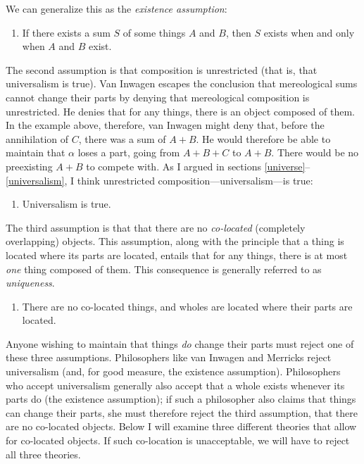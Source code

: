 \documentclass[11pt]{article}
\begin{document}
\begin{spacing}{1.5}
We can generalize this as the {\em existence assumption}:

\begin{enumerate}[ref=(\arabic*)]
  \item If there exists a sum $S$ of some things $A$ and $B$, then $S$
    exists when and only when $A$ and $B$ exist. \label{ass-ex}
\end{enumerate}

The second assumption is that composition is unrestricted (that is,
that universalism is true).  Van Inwagen escapes the conclusion that
mereological sums cannot change their parts by denying that
mereological composition is unrestricted.  He denies that for any
things, there is an object composed of them.  In the example above,
therefore, van Inwagen might deny that, before the annihilation of
$C$, there was a sum of $A + B$.  He would therefore be able to
maintain that $\alpha$ loses a part, going from $A + B + C$ to $A +
B$.  There would be no preexisting $A + B$ to compete with.  As I
argued in sections \ref{universe}--\ref{universalism}, I think
unrestricted composition---universalism---is true:

\begin{enumerate}[start=2, ref=(\arabic*)]
  \item Universalism is true. \label{ass-uni}
\end{enumerate}

The third assumption is that that there are no {\em co-located}
(completely overlapping) objects.  This assumption, along with the
principle that a thing is located where its parts are located, entails
that for any things, there is at most {\em one} thing composed of
them.  This consequence is generally referred to as {\em uniqueness}.

\begin{enumerate}[start=3, ref=(\arabic*)]
  \item There are no co-located things, and wholes are located where
    their parts are located. \label{ass-co}
\end{enumerate}

Anyone wishing to maintain that things {\em do} change their parts
must reject one of these three assumptions.  Philosophers like van
Inwagen and Merricks reject universalism (and, for good measure, the
existence assumption).  Philosophers who accept universalism generally
also accept that a whole exists whenever its parts do (the existence
assumption); if such a philosopher also claims that things can change
their parts, she must therefore reject the third assumption, that
there are no co-located objects.  Below I will examine three different
theories that allow for co-located objects.  If such co-location is
unacceptable, we will have to reject all three theories.


\end{spacing}
\end{document}

